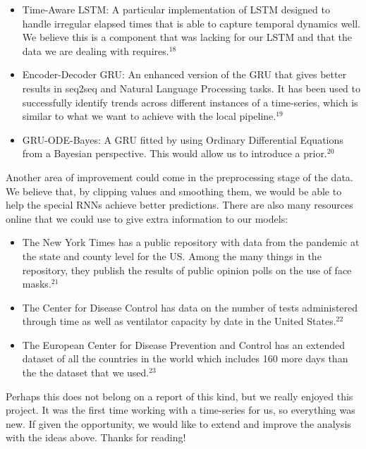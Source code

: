 \documentclass{article}
\begin{document}
\begin{itemize}
\item Time-Aware LSTM: A particular implementation of LSTM designed to handle irregular elapsed times that is able to capture temporal dynamics well. We believe this is a component that was lacking for our LSTM and that the data we are dealing with requires.$^{18}$	
 \item Encoder-Decoder GRU: An enhanced version of the GRU that gives better results in seq2seq and Natural Language Processing tasks. It has been used to successfully identify trends across different instances of a time-series, which is similar to what we want to achieve with the local pipeline.$^{19}$
\item GRU-ODE-Bayes: A GRU fitted by using Ordinary Differential Equations from a Bayesian perspective. This would allow us to introduce a prior.$^{20}$
\end{itemize}

Another area of improvement could come in the preprocessing stage of the data. We believe that, by clipping values and smoothing them, we would be able to help the special RNNs achieve better predictions. There are also many resources online that we could use to give extra information to our models:
\begin{itemize}
\item The New York Times has a public repository with data from the pandemic at the state and county level for the US. Among the many things in the repository, they publish the results of public opinion polls on the use of face masks.$^{21}$
\item The Center for Disease Control has data on the number of tests administered through time as well as ventilator capacity by date in the United States.$^{22}$
\item The European Center for Disease Prevention and Control has an extended dataset of all the countries in the world which includes 160 more days than the the dataset that we used.$^{23}$
\end{itemize}

Perhaps this does not belong on a report of this kind, but we really enjoyed this project. It was the first time working with a time-series for us, so everything was new. If given the opportunity, we would like to extend and improve the analysis with the ideas above. Thanks for reading!
\end{document}

